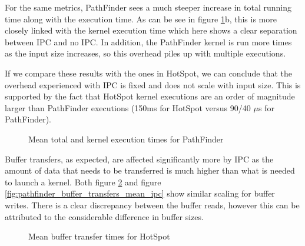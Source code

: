 For the same metrics, PathFinder sees a much steeper increase in total running time along with the execution time. As can be see in figure \ref{fig:pathfinder_total_and_kernel_executions_mean_ipc}b, this is more closely linked with the kernel execution time which here shows a clear separation between IPC and no IPC. In addition, the PathFinder kernel is run more times as the input size increases, so this overhead piles up with multiple executions.

If we compare these results with the ones in HotSpot, we can conclude that the overhead experienced with IPC is fixed and does not scale with input size. This is supported by the fact that HotSpot kernel executions are an order of magnitude larger than PathFinder executions (150ms for HotSpot versus 90/40 $\mu$s for PathFinder).

\begin{figure}%
    \centering
    \qquad
    \captionsetup{justification=centering}
    \caption{Mean total and kernel execution times for PathFinder}%
    \label{fig:pathfinder_total_and_kernel_executions_mean_ipc}%
\end{figure}

Buffer transfers, as expected, are affected significantly more by IPC as the amount of data that needs to be transferred is much higher than what is needed to launch a kernel. Both figure \ref{fig:hotspot_buffer_transfers_mean_ipc} and figure \ref{fig:pathfinder_buffer_transfers_mean_ipc} show similar scaling for buffer writes. There is a clear discrepancy between the buffer reads, however this can be attributed to the considerable difference in buffer sizes.


\begin{figure}%
    \centering
    \qquad
    \captionsetup{justification=centering}
    \caption{Mean buffer transfer times for HotSpot}%
    \label{fig:hotspot_buffer_transfers_mean_ipc}%
\end{figure}


